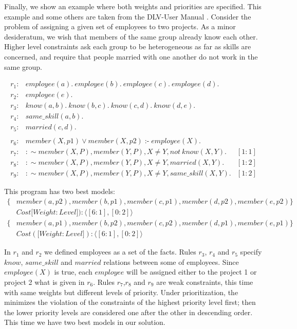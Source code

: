 \documentclass[a4paper, titlepage]{article}
\DeclareMathOperator{\leftimpl}{:-}
\begin{document}
Finally, we show an example where both weights and 
priorities are specified. This example and some others are 
taken from the DLV-User Manual \cite{dlvum}. Consider the 
problem of assigning a given set of employees to two 
projects. As a minor desideratum, we wish that members of 
the same group already know each other. Higher level 
constraints ask each group to be heterogeneous as far as 
skills are concerned, and require that people married with 
one another do not work in the same group.
\begin{exmp}
\begin{align*}
r_1\colon& \mathit{employee}(a). \ \mathit{employee}(b). \ 
\mathit{employee}(c). \ \mathit{employee(d)}. \ \\
r_2\colon& \mathit{employee}(e). \\
r_3\colon& \mathit{know}(a,b). \ \mathit{know}(b,c). \ 
\mathit{know}(c,d). \ \mathit{know}(d,e). \ \\
r_4\colon& \mathit{same\_skill}(a,b). \\
r_5\colon& \mathit{married(c,d)}. \\
\\ 
r_6\colon& \mathit{member}(X,p1) \vee \mathit{member}(X,p2) 
\leftimpl \mathit{employee}(X).\\
r_7\colon& : \sim \mathit{member}(X,P), \mathit{member}
(Y,P), X \neq Y, \mathit{not} \ \mathit{know(X,Y)}.& 
[1:1] \\
r_{8}\colon& : \sim  \mathit{member}(X,P), \mathit{member}
(Y,P), X \neq Y, \mathit{marrie}d(X,Y). & [1:2]\\
r_{9}\colon& : \sim member(X,P), member(Y,P), X \neq Y, 
same\_skill(X,Y). & [1:2] 
\end{align*}
\end{exmp}
This program has two best models:
\begin{align*}
\{ & \mathit{member}(a,p2), \mathit{member}(b,p1), 
   \mathit{member}(c,p1), \mathit{member}(d,p2), 
   \mathit{member}(e,p2) \} \\
   & \mathit{Cost} [ \mathit{Weight:Level]}):  \langle 
   [6:1],[0:2] \rangle \\ 
\{ & \mathit{member}(a,p1), \mathit{member}(b,p2), 
   \mathit{member}(c,p2), \mathit{member}(d,p1), 
   \mathit{member}(e,p1) \} \\
   & \mathit{Cost} ([ \mathit{Weight:Level]}):\langle 
   [6:1],[0:2] \rangle
\end{align*}



In $r_1$ and $r_2$ we defined employees as a set of the 
facts. Rules $r_3$, $r_4$ and $r_5$ specify $\mathit{know}$, 
$\mathit{same\_skill}$ and $\mathit{married}$ relations 
between some of employees. Since $\mathit{employee}(X)$ is 
true, each $\mathit{employee}$ will be assigned either to 
the project 1 or project 2 what is given in $r_6$. Rules $r_{7}$,$r_{8}$ and $r_{9}$ 
are weak constraints, this time with 
same weights but different levels of priority. Under 
prioritization, the \dlvhex{} minimizes the violation of 
the constraints of the highest priority level first; then 
the lower priority levels are considered one after the 
other in descending order. This time we have two best 
models in our solution.     
\end{document}
